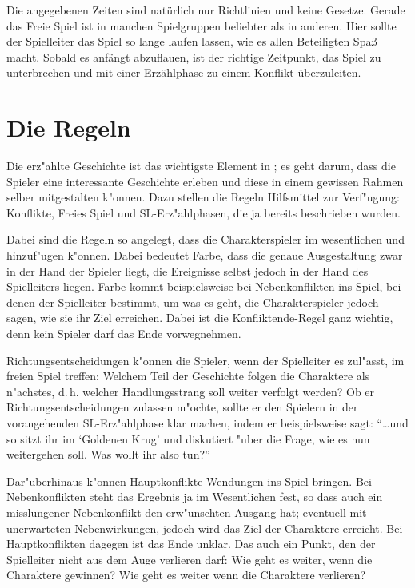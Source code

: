 Die angegebenen Zeiten sind natürlich nur Richtlinien und keine Gesetze. Gerade das Freie Spiel ist in manchen Spielgruppen beliebter als in anderen. Hier sollte der Spielleiter das Spiel so lange laufen lassen, wie es allen Beteiligten Spaß macht. Sobald es anfängt abzuflauen, ist der richtige Zeitpunkt, das Spiel zu unterbrechen und mit einer Erzählphase zu einem Konflikt überzuleiten.


\section{Die Regeln}
Die erz"ahlte Geschichte ist das wichtigste Element in \StoryDSA; es geht darum, dass die Spieler eine interessante Geschichte erleben und diese in einem gewissen Rahmen selber mitgestalten k"onnen. Dazu stellen die Regeln Hilfsmittel zur Verf"ugung: Konflikte, Freies Spiel und SL-Erz"ahlphasen, die ja bereits beschrieben wurden.

Dabei sind die Regeln so angelegt, dass die Charakterspieler im wesentlichen  und  hinzuf"ugen k"onnen. Dabei bedeutet Farbe, dass die genaue Ausgestaltung zwar in der Hand der Spieler liegt, die Ereignisse selbst jedoch in der Hand des Spielleiters liegen. Farbe kommt beispielsweise bei Nebenkonflikten ins Spiel, bei denen der Spielleiter bestimmt, um was es geht, die Charakterspieler jedoch sagen, wie sie ihr Ziel erreichen. Dabei ist die Konfliktende-Regel ganz wichtig, denn kein Spieler darf das Ende vorwegnehmen.

Richtungsentscheidungen k"onnen die Spieler, wenn der Spielleiter es zul"asst, im freien Spiel treffen: Welchem Teil der Geschichte folgen die Charaktere als n"achstes, d.\,h. welcher Handlungsstrang soll weiter verfolgt werden? Ob er Richtungsentscheidungen zulassen m"ochte, sollte er den Spielern in der vorangehenden SL-Erz"ahlphase klar machen, indem er beispielsweise sagt: ``\dots und so sitzt ihr im `Goldenen Krug' und diskutiert "uber die Frage, wie es nun weitergehen soll. Was wollt ihr also tun?''

Dar"uberhinaus k"onnen Hauptkonflikte Wendungen ins Spiel bringen. Bei Nebenkonflikten steht das Ergebnis ja im Wesentlichen fest, so dass auch ein misslungener Nebenkonflikt den erw"unschten Ausgang hat; eventuell mit unerwarteten Nebenwirkungen, jedoch wird das Ziel der Charaktere erreicht. Bei Hauptkonflikten dagegen ist das Ende unklar. Das auch ein Punkt, den der Spielleiter nicht aus dem Auge verlieren darf: Wie geht es weiter, wenn die Charaktere gewinnen? Wie geht es weiter wenn die Charaktere verlieren?

